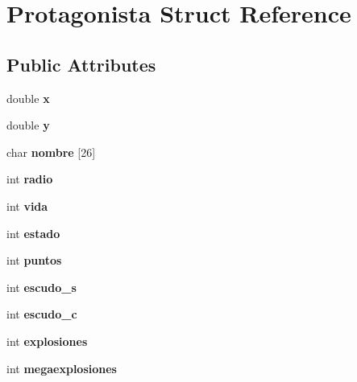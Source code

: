 \hypertarget{struct_protagonista}{}\section{Protagonista Struct Reference}
\label{struct_protagonista}
\subsection*{Public Attributes}
\begin{DoxyCompactItemize}
\item 
double {\bfseries x}\hypertarget{struct_protagonista_a2d1a4d6c3177b2d1fdff58ad15621e9e}{}\label{struct_protagonista_a2d1a4d6c3177b2d1fdff58ad15621e9e}

\item 
double {\bfseries y}\hypertarget{struct_protagonista_a8b5aa56a60dbf2c60e6582b458cfcdde}{}\label{struct_protagonista_a8b5aa56a60dbf2c60e6582b458cfcdde}

\item 
char {\bfseries nombre} \mbox{[}26\mbox{]}\hypertarget{struct_protagonista_a8806db0e1e79a2094f5baab175d6ed21}{}\label{struct_protagonista_a8806db0e1e79a2094f5baab175d6ed21}

\item 
int {\bfseries radio}\hypertarget{struct_protagonista_a2d1dea474375846a2e2603f32035316d}{}\label{struct_protagonista_a2d1dea474375846a2e2603f32035316d}

\item 
int {\bfseries vida}\hypertarget{struct_protagonista_a116b72133b37591f7d751a8e8f7591cc}{}\label{struct_protagonista_a116b72133b37591f7d751a8e8f7591cc}

\item 
int {\bfseries estado}\hypertarget{struct_protagonista_aacc03322baf868ada6a43180c8acdc12}{}\label{struct_protagonista_aacc03322baf868ada6a43180c8acdc12}

\item 
int {\bfseries puntos}\hypertarget{struct_protagonista_a032900f5b46d1f600e587fcf9896d4f0}{}\label{struct_protagonista_a032900f5b46d1f600e587fcf9896d4f0}

\item 
int {\bfseries escudo\+\_\+s}\hypertarget{struct_protagonista_af42fbd83b3dbd371af36181b426085cb}{}\label{struct_protagonista_af42fbd83b3dbd371af36181b426085cb}

\item 
int {\bfseries escudo\+\_\+c}\hypertarget{struct_protagonista_ab2ad9d18fa7ff20b4e1f3044964c2d49}{}\label{struct_protagonista_ab2ad9d18fa7ff20b4e1f3044964c2d49}

\item 
int {\bfseries explosiones}\hypertarget{struct_protagonista_a65367a087cbdebe3360783df755314ae}{}\label{struct_protagonista_a65367a087cbdebe3360783df755314ae}

\item 
int {\bfseries megaexplosiones}\hypertarget{struct_protagonista_a52fc2de932d830c73c56ebe2ca8850e4}{}\label{struct_protagonista_a52fc2de932d830c73c56ebe2ca8850e4}

\end{DoxyCompactItemize}


